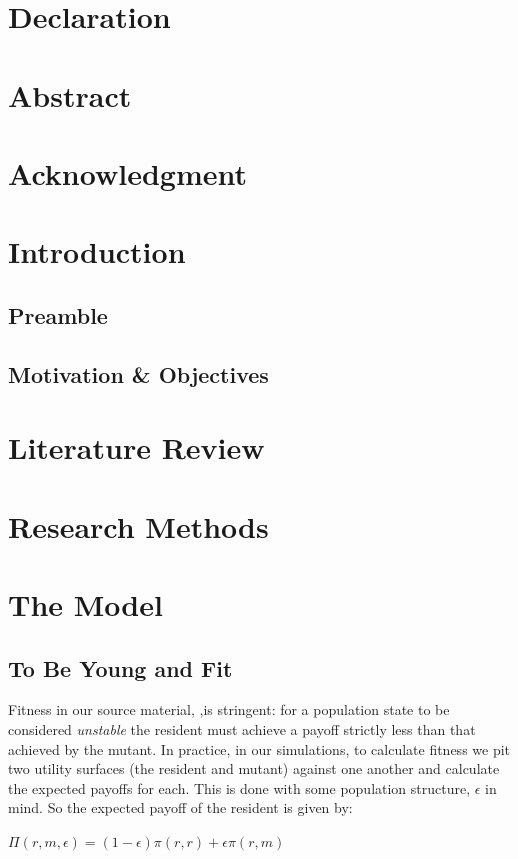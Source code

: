 \documentclass[11pt]{book}
\begin{document}
\newpage
\chapter*{Declaration}
\chapter*{Abstract}
\chapter*{Acknowledgment}

\tableofcontents
\newpage
\chapter{Introduction}
\section{Preamble}
\section{Motivation \& Objectives}

\chapter{Literature Review}

\chapter{Research Methods}
\chapter{The Model}
\section{To Be Young and Fit}
Fitness in our source material, \citet{alger_homo_2013},is stringent: for a population state to be considered \textit{unstable} the resident must achieve a payoff strictly less than that achieved by the mutant.
In practice, in our simulations, to calculate fitness we pit two utility surfaces (the resident and mutant) against one another and calculate the expected payoffs for each.
This is done with some population structure, $\epsilon$ in mind. So the expected payoff of the resident is given by:
\begin{center}
$\Pi(r, m, \epsilon) = (1-\epsilon)\pi(r,r) + \epsilon\pi(r,m)$
\end{center}
\end{document}
